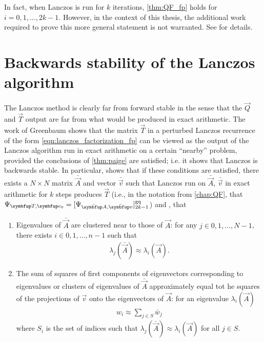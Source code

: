 \begin{remark}
    In fact, when Lanczos is run for \( k \) iterations, \cref{thm:QF_fp} holds for \( i=0,1,\ldots, 2k-1 \).
    However, in the context of this thesis, the additional work required to prove this more general statement is not warranted.
    See \cite{knizhnerman_96} for details.
\end{remark}


\section{Backwards stability of the Lanczos algorithm}

The Lanczos method is clearly far from forward stable in the sense that the \( \vec{Q} \) and \( \vec{T} \) output are far from what would be produced in exact arithmetic.
The work of Greenbaum \cite{greenbaum_89} shows that the matrix \( \vec{T} \) in a perturbed Lanczos recurrence of the form \cref{eqn:lanczos_factorization_fp} can be viewed as the output of the Lanczos algorithm run in exact arithmetic on a certain ``nearby'' problem, provided the conclusions of \cref{thm:paige} are satisfied; i.e. it shows that Lanczos is backwards stable.
In particular, \cite{greenbaum_89} shows that if these conditions are satisfied, there exists a \( N\times N \) matrix \( \bar{\vec{A}} \) and vector \( \bar{\vec{v}} \) such that Lanczos run on \( \bar{\vec{A}} \), \( \bar{\vec{v}} \) in exact arithmetic for \( k \) steps produces \( \vec{T} \) (i.e., in the notation from \cref{chap:QF}, that \( \Psi_{\vec{T},\vec{e}_0} = \qq[g]{\Psi_{\bar{\vec{A}},\bar{\vec{v}}}}{2k-1} \)) and , that
\begin{enumerate}[label=(\roman*),nolistsep]
    \item  
        Eigenvalues of \( \bar{\vec{A}} \) are clustered near to those of \( \vec{A} \):
        for any \( j \in 0,1,\ldots, N-1 \), there exists \( i\in 0,1,\ldots, n-1   \) such that 
    \begin{align*}
        \lambda_j(\bar{\vec{A}}) \approx \lambda_i(\vec{A}).
    \end{align*}

    \item 
        The sum of squares of first components of eigenvectors corresponding to eigenvalues or clusters of eigenvalues of \( \bar{\vec{A}} \) approximately equal tot he squares of the projections of \( \vec{v} \) onto the eigenvectors of \( \vec{A} \):
        for an eigenvalue \( \lambda_i(\vec{A}) \)
        \begin{align*}
            w_i \approx \sum_{j\in S} \bar{w}_j
        \end{align*}
        where \( S_i \) is the set of indices such that \( \lambda_j(\bar{\vec{A}}) \approx \lambda_i(\vec{A}) \) for all \( j\in S \).
\end{enumerate}

